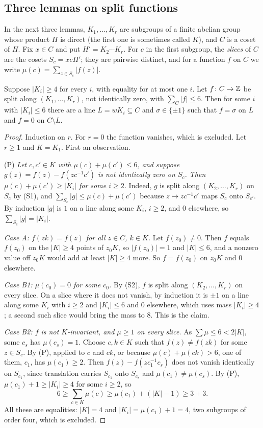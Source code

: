 \subsection{Three lemmas on split functions}
In the next three lemmas, $K_{1},\dots,K_{r}$ are subgroups of a finite
abelian group whose product $H$ is direct (the first one is sometimes called
$K$), and $C$ is a coset of $H$. Fix $x\in C$ and put $H'=K_{2}\cdots K_{r}$. For $c$ in the
first subgroup, the \emph{slices} of $C$ are the cosets $S_{c}=xcH'$; they
are pairwise distinct, and for a function $f$ on $C$ we write
$\mu(c)=\sum_{z\in S_{c}}|f(z)|$.

\begin{lemma}\label{lem:grid}
Suppose $|K_{i}|\ge4$ for every $i$, with equality for at most one $i$. Let
$f\colon C\to\mathbb{Z}$ be split along $(K_{1},\dots,K_{r})$, not identically zero,
with $\sum_{C}|f|\le6$. Then for some $i$ with $|K_{i}|\le6$ there are a line
$L=wK_{i}\subseteq C$ and $\sigma\in\{\pm1\}$ such that $f=\sigma$ on $L$ and
$f=0$ on $C\setminus L$.
\end{lemma}

\begin{proof}
Induction on $r$. For $r=0$ the function vanishes, which is excluded. Let
$r\ge1$ and $K=K_{1}$. First an observation.

(P) \emph{Let $c,c'\in K$ with $\mu(c)+\mu(c')\le6$, and suppose
$g(z)=f(z)-f(zc^{-1}c')$ is not identically zero on $S_{c}$. Then
$\mu(c)+\mu(c')\ge|K_{i}|$ for some $i\ge2$.} Indeed, $g$ is split along
$(K_{2},\dots,K_{r})$ on $S_{c}$ by (S1), and $\sum_{S_{c}}|g|\le\mu(c)+
\mu(c')$ because $z\mapsto zc^{-1}c'$ maps $S_{c}$ onto $S_{c'}$. By
induction $|g|$ is $1$ on a line along some $K_{i}$, $i\ge2$, and $0$
elsewhere, so $\sum_{S_{c}}|g|=|K_{i}|$.

\emph{Case A: $f(zk)=f(z)$ for all $z\in C$, $k\in K$.} Let $f(z_{0})\ne0$.
Then $f$ equals $f(z_{0})$ on the $|K|\ge4$ points of $z_{0}K$, so
$|f(z_{0})|=1$ and $|K|\le6$, and a nonzero value off $z_{0}K$ would add at
least $|K|\ge4$ more. So $f=f(z_{0})$ on $z_{0}K$ and $0$ elsewhere.

\emph{Case B1: $\mu(c_{0})=0$ for some $c_{0}$.} By (S2), $f$ is split along
$(K_{2},\dots,K_{r})$ on every slice. On a slice where it does not vanish, by
induction it is $\pm1$ on a line along some $K_{i}$ with $i\ge2$ and
$|K_{i}|\le6$ and $0$ elsewhere, which uses mass $|K_{i}|\ge4$; a second such
slice would bring the mass to $8$. This is the claim.

\emph{Case B2: $f$ is not $K$-invariant, and $\mu\ge1$ on every slice.} As
$\sum\mu\le6<2|K|$, some $c_{s}$ has $\mu(c_{s})=1$. Choose $c,k\in K$ such
that $f(z)\ne f(zk)$ for some $z\in S_{c}$. By (P), applied to $c$ and $ck$,
or because $\mu(c)+\mu(ck)>6$, one of them, $c_{1}$, has $\mu(c_{1})\ge2$.
Then $f(z)-f(zc_{1}^{-1}c_{s})$ does not vanish identically on $S_{c_{1}}$,
since translation carries $S_{c_{1}}$ onto $S_{c_{s}}$ and $\mu(c_{1})\ne
\mu(c_{s})$. By (P), $\mu(c_{1})+1\ge|K_{i}|\ge4$ for some $i\ge2$, so
\[
  6\ge\sum_{c\in K}\mu(c)\ge\mu(c_{1})+(|K|-1)\ge3+3.
\]
All these are equalities: $|K|=4$ and $|K_{i}|=\mu(c_{1})+1=4$, two
subgroups of order four, which is excluded.
\end{proof}

